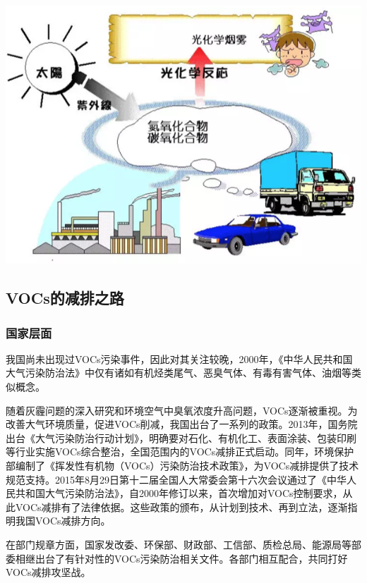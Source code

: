 \documentclass[]{book}
\begin{document}
\includegraphics[width=8.33in]{images/voc6}

\hypertarget{vocsux7684ux51cfux6392ux4e4bux8def}{%
\subsection{VOCs的减排之路}\label{vocsux7684ux51cfux6392ux4e4bux8def}}

\hypertarget{ux56fdux5bb6ux5c42ux9762}{%
\subsubsection{国家层面}\label{ux56fdux5bb6ux5c42ux9762}}

我国尚未出现过VOCs污染事件，因此对其关注较晚，2000年，《中华人民共和国大气污染防治法》中仅有诸如有机烃类尾气、恶臭气体、有毒有害气体、油烟等类似概念。

随着灰霾问题的深入研究和环境空气中臭氧浓度升高问题，VOCs逐渐被重视。为改善大气环境质量，促进VOCs削减，我国出台了一系列的政策。2013年，国务院出台《大气污染防治行动计划》，明确要对石化、有机化工、表面涂装、包装印刷等行业实施VOCs综合整治，全国范围内的VOCs减排正式启动。同年，环境保护部编制了《挥发性有机物（VOCs）污染防治技术政策》，为VOCs减排提供了技术规范支持。2015年8月29日第十二届全国人大常委会第十六次会议通过了《中华人民共和国大气污染防治法》，自2000年修订以来，首次增加对VOCs控制要求，从此VOCs减排有了法律依据。这些政策的颁布，从计划到技术、再到立法，逐渐指明我国VOCs减排方向。

在部门规章方面，国家发改委、环保部、财政部、工信部、质检总局、能源局等部委相继出台了有针对性的VOCs污染防治相关文件。各部门相互配合，共同打好VOCs减排攻坚战。
\end{document}
